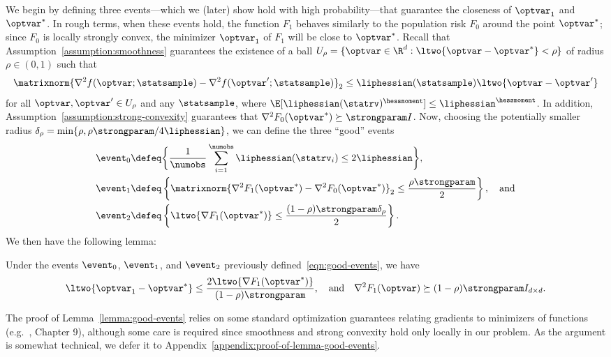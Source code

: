 \documentclass[11pt,twoside]{article}
\theoremstyle{definition}
\begin{document}
We begin by defining three events---which we (later) show hold with
high probability---that guarantee the closeness of $\optvar_1$ and
$\optvar^*$. In rough terms, when these events hold, the function
$F_1$ behaves similarly to the population risk $F_0$ around the point
$\optvar^*$; since $F_0$ is locally strongly convex, the minimizer
$\optvar_1$ of $F_1$ will be close to $\optvar^*$.  Recall that
Assumption~\ref{assumption:smoothness} guarantees the existence of a
ball $U_\rho = \{\optvar \in \R^d : \ltwo{\optvar - \optvar^*} <
\rho\}$ of radius $\rho \in (0, 1)$ such that
\begin{equation*}
  \matrixnorm{\nabla^2 f(\optvar; \statsample)
    - \nabla^2 f(\optvar'; \statsample)}_2
  \le \liphessian(\statsample) \ltwo{\optvar - \optvar'}
\end{equation*}
for all $\optvar, \optvar' \in U_\rho$ and any $\statsample$, where
$\E[\liphessian(\statrv)^\hessmoment] \le \liphessian^\hessmoment$. In
addition, Assumption~\ref{assumption:strong-convexity} guarantees that
$\nabla^2 F_0(\optvar^*) \succeq \strongparam I$. Now, choosing the
potentially smaller radius $\delta_\rho = \min\{\rho, \rho
\strongparam / 4 \liphessian\}$, we can define the three ``good''
events
\begin{align}
  \event_0 & \defeq \bigg\{ \frac{1}{\numobs} \sum_{i=1}^\numobs
  \liphessian(\statrv_i) \le 2 \liphessian \bigg\}, \nonumber
  \\ \event_1 & \defeq \left\{\matrixnorm{\nabla^2 F_1(\optvar^*) -
    \nabla^2 F_0(\optvar^*)}_2 \le \frac{\rho \strongparam}{2}
  \right\}, \quad \mbox{and}
  \label{eqn:good-events} \\
  \event_2 & \defeq \left\{\ltwo{\nabla F_1(\optvar^*)} \le
  \frac{(1 - \rho) \strongparam \delta_\rho}{2}
  \right\}. \nonumber
\end{align}
We then have the following lemma:
%
\begin{lemma}
  \label{lemma:good-events}
  Under the events $\event_0$, $\event_1$, and $\event_2$ previously
  defined~\eqref{eqn:good-events}, we have
  \begin{equation*}
    \ltwo{\optvar_1 - \optvar^*} \le \frac{2 \ltwo{\nabla
        F_1(\optvar^*)}}{ (1 - \rho) \strongparam}, \quad \mbox{and}
    \quad \nabla^2 F_1(\optvar) \succeq (1 - \rho) \strongparam I_{d
      \times d}.
  \end{equation*}
\end{lemma}
\noindent
The proof of Lemma~\ref{lemma:good-events} relies on some standard
optimization guarantees relating gradients to minimizers of functions
(e.g.~\cite{BoydVa04}, Chapter 9), although some care is required
since smoothness and strong convexity hold only locally in our
problem. As the argument is somewhat technical, we defer it to
Appendix~\ref{appendix:proof-of-lemma-good-events}.
\end{document}
